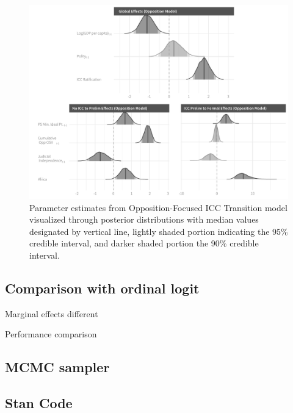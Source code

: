 \begin{figure}
    \centering
    \includegraphics[width=1\textwidth]{rebelCoefSumm_ptsCivilWarOnly.pdf}
    \caption{Parameter estimates from Opposition-Focused ICC Transition model visualized through posterior distributions with median values designated by vertical line, lightly shaded portion indicating the 95\% credible interval, and darker shaded portion the 90\% credible interval.}
    \label{fig:rebelModel}
\end{figure}

\subsection*{Comparison with ordinal logit}

Marginal effects different

Performance comparison

\subsection*{MCMC sampler}


\subsection*{Stan Code}



